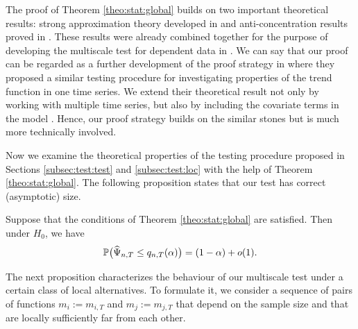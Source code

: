\documentclass[a4paper,12pt]{article}
\makeatletter
\renewcommand{\eqref}[1]{\tagform@{\ref{#1}}}
\newcommand{\doublehattwo}[1]{\widehat{\widehat{#1}}}
\makeatother
\begin{document}

\begin{remark}
The proof of Theorem \ref{theo:stat:global} builds on two important theoretical results: strong approximation theory developed in \cite{BerkesLiuWu2014} and anti-concentration results proved in \cite{Chernozhukov2015}. These results were already combined together for the purpose of developing the multiscale test for dependent data in \cite{KhismatullinaVogt2020}. We can say that our proof can be regarded as a further development of the proof strategy in \cite{KhismatullinaVogt2020} where they proposed a similar testing procedure for investigating properties of the trend function in one time series. We extend their theoretical result not only by working with multiple time series, but also by including the covariate terms in the model \eqref{eq:model}. Hence, our proof strategy builds on the similar stones but is much more technically involved.
\end{remark}

Now we examine the theoretical properties of the testing procedure proposed in \linebreak Sections \ref{subsec:test:test} and \ref{subsec:test:loc} with the help of Theorem \ref{theo:stat:global}. The following proposition 
states that our test has correct (asymptotic) size.

\begin{prop}\label{prop:test}
Suppose that the conditions of Theorem \ref{theo:stat:global} are satisfied. Then under $H_0$, we have
\[ \mathbb{P} \big( \widehat{\Psi}_{n,T} \le q_{n,T}(\alpha) \big) = (1 - \alpha) + o(1). \]
\end{prop}

The next proposition characterizes the behaviour of our multiscale test under a certain class of local alternatives. To formulate it, we consider a sequence of pairs of functions $m_ i := m_{i,T}$ and $m_ j := m_{j,T}$ that depend on the sample size and that are locally sufficiently far from each other.
\end{document}

